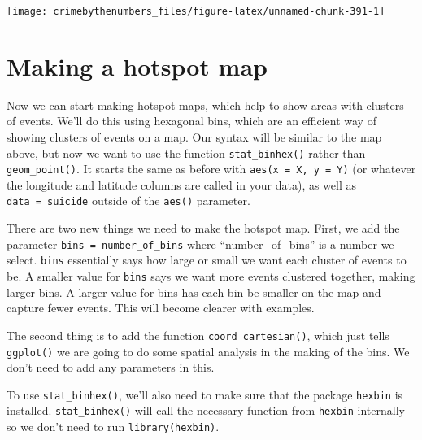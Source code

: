 \documentclass[
  a4paper,
]{krantz}
\makeatletter
\newenvironment{Shaded}{\begin{snugshade}}{\end{snugshade}}
\newcommand{\AttributeTok}[1]{\textcolor[rgb]{0.77,0.63,0.00}{#1}}
\newcommand{\FunctionTok}[1]{\textcolor[rgb]{0.00,0.00,0.00}{#1}}
\newcommand{\NormalTok}[1]{#1}
\newcommand{\SpecialCharTok}[1]{\textcolor[rgb]{0.00,0.00,0.00}{#1}}
\newcommand{\StringTok}[1]{\textcolor[rgb]{0.31,0.60,0.02}{#1}}
\newenvironment{kframe}{%
\medskip{}
\setlength{\fboxsep}{.8em}
 \def\at@end@of@kframe{}%
 \ifinner\ifhmode%
  \def\at@end@of@kframe{\end{minipage}}%
  \begin{minipage}{\columnwidth}%
 \fi\fi%
 \def\FrameCommand##1{\hskip\@totalleftmargin \hskip-\fboxsep
 \colorbox{shadecolor}{##1}\hskip-\fboxsep
     \hskip-\linewidth \hskip-\@totalleftmargin \hskip\columnwidth}%
 \MakeFramed {\advance\hsize-\width
   \@totalleftmargin\z@ \linewidth\hsize
   \@setminipage}}%
 {\par\unskip\endMakeFramed%
 \at@end@of@kframe}
\renewenvironment{Shaded}{\begin{kframe}}{\end{kframe}}
\makeatother
\begin{document}
\begin{Shaded}
\end{Shaded}

\begin{center}\texttt{[image: crimebythenumbers\_files/figure-latex/unnamed-chunk-391-1]} \end{center}

\hypertarget{making-a-hotspot-map}{%
\section{Making a hotspot map}\label{making-a-hotspot-map}}

Now we can start making hotspot maps, which help to show
areas with clusters of events. We'll do this using hexagonal
bins, which are an efficient way of showing clusters of
events on a map. Our syntax will be similar to the map
above, but now we want to use the function
\texttt{stat\_binhex()} rather than \texttt{geom\_point()}.
It starts the same as before with
\texttt{aes(x\ =\ X,\ y\ =\ Y)} (or whatever the longitude
and latitude columns are called in your data), as well as
\texttt{data\ =\ suicide} outside of the \texttt{aes()}
parameter.

There are two new things we need to make the hotspot map.
First, we add the parameter
\texttt{bins\ =\ number\_of\_bins} where
``number\_of\_bins'' is a number we select. \texttt{bins}
essentially says how large or small we want each cluster of
events to be. A smaller value for \texttt{bins} says we want
more events clustered together, making larger bins. A larger
value for bins has each bin be smaller on the map and
capture fewer events. This will become clearer with
examples.

The second thing is to add the function
\texttt{coord\_cartesian()}, which just tells
\texttt{ggplot()} we are going to do some spatial analysis
in the making of the bins. We don't need to add any
parameters in this.

To use \texttt{stat\_binhex()}, we'll also need to make sure
that the package \texttt{hexbin} is installed.
\texttt{stat\_binhex()} will call the necessary function
from \texttt{hexbin} internally so we don't need to run
\texttt{library(hexbin)}.
\end{document}

